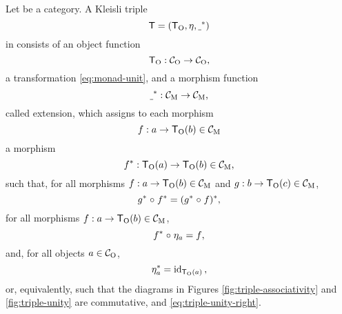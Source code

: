 \begin{definition}
  \label{def:triple}


  Let  be a category. A Kleisli triple
  \begin{equation}
    \label{eq:triple}
    \mon{T} = (\funcO{T}, \nat{\eta}, \monM{T}{\underscore})
  \end{equation}
  in  consists of an object function
  \begin{equation}
    \label{eq:triple-}
    \funcO{T}: \catO{C} \to \catO{C}
    \text{,}
  \end{equation}
  a transformation \nat{\eta} \eqref{eq:monad-unit}, and a morphism
  function
  \begin{equation}
    \label{eq:triple-extension}
    \monM{T}{\underscore}: \catM{C} \to \catM{C}
    \text{,}
  \end{equation}
  called extension, which assigns to each morphism
  \begin{equation*}
    f: a \to \funcO{T}(b) \in \catM{C}
  \end{equation*}
  a morphism
  \begin{equation*}
    \monM{T}{f}: \funcO{T}(a) \to \funcO{T}(b) \in \catM{C}
    \text{,}
  \end{equation*}
  such that, for all morphisms $f: a \to \funcO{T}(b) \in \catM{C}$
  and $g: b \to \funcO{T}(c) \in \catM{C}$,
  \begin{equation}
    \label{eq:triple-associativity}
    \monM{T}{g} \comp \monM{T}{f} = \monM{T}{(\monM{T}{g} \comp f)}
    \text{,}
  \end{equation}
  for all morphisms $f: a \to \funcO{T}(b) \in \catM{C}$,
  \begin{equation}
    \label{eq:triple-unity-left}
    \monM{T}{f} \comp \natO{\eta}{a} = f
    \text{,}
  \end{equation}
  and, for all objects $a \in \catO{C}$,
  \begin{equation}
    \label{eq:triple-unity-right}
    \monM{T}{\natO{\eta}{a}} = \idO{\funcO{T}(a)}
    \text{,}
  \end{equation}
  or, equivalently, such that the diagrams in Figures
  \ref{fig:triple-associativity} and \ref{fig:triple-unity} are
  commutative, and \eqref{eq:triple-unity-right}.
  \begin{figure}[htb]
    \begin{subfigure}[b]{0.5\linewidth}
      \begin{center}
\end{center}
\end{subfigure}
\end{figure}
\end{definition}
